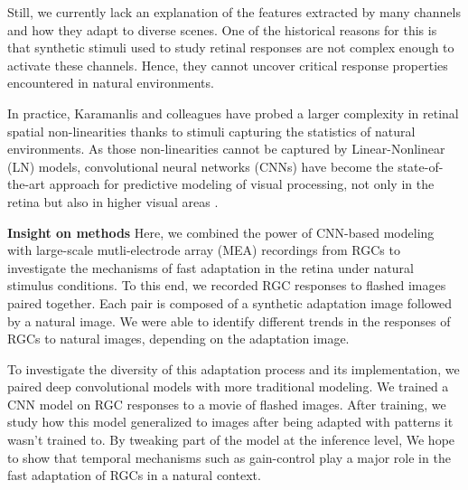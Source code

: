 Still, we currently lack an explanation of the features extracted by many
channels and how they adapt to diverse scenes. One of the historical
reasons for this is that synthetic stimuli used
to study retinal responses are not complex enough to activate these channels.
Hence, they cannot uncover critical response properties encountered in natural
environments. %

In practice, Karamanlis and colleagues \citep{kim_nonlinear_2020} have
probed a larger complexity in retinal spatial non-linearities thanks to stimuli
capturing the statistics of natural environments.
As those non-linearities cannot be captured by Linear-Nonlinear (LN) models,
convolutional neural networks (CNNs) have become the state-of-the-art approach
for predictive modeling of visual processing, not only in the retina but also
in higher visual areas \citep{mcintosh_deep_2017}.

\textbf{Insight on methods}
Here, we combined the power of CNN-based modeling with large-scale
mutli-electrode array (MEA) recordings from RGCs to investigate the mechanisms
of fast
adaptation in the retina under natural stimulus conditions. To this end, we
recorded RGC responses to flashed images paired together. Each pair is composed
of a synthetic adaptation image followed by a natural image. We were able to
identify different trends in the responses of RGCs to natural images, depending
on the adaptation image. %

To investigate the diversity of this adaptation process and its implementation,
we paired deep convolutional models with more traditional modeling. We trained
a CNN model on RGC responses to a movie of flashed images. After training, we
study how this model generalized to images after being adapted with
patterns it wasn't trained to. By tweaking part of the model at the inference
level, We hope to show that temporal mechanisms such as gain-control play a
major role in the fast adaptation of RGCs in a natural context.